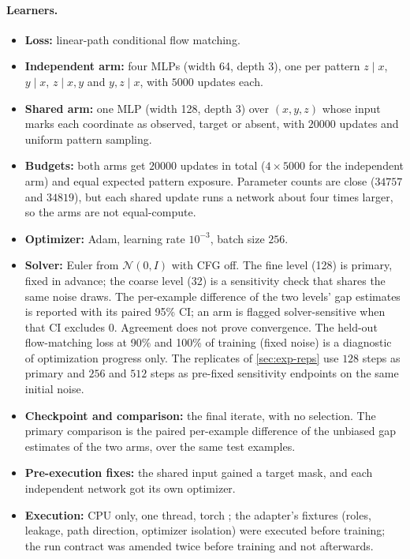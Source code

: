 \documentclass{article}
\theoremstyle{plain}
\theoremstyle{definition}
\theoremstyle{remark}
\begin{document}
\paragraph{Learners.}
\begin{itemize}
\item \textbf{Loss:} linear-path conditional flow matching.
\item \textbf{Independent arm:} four MLPs (width 64, depth 3), one per pattern $z\mid x$, $y\mid x$, $z\mid x,y$ and $y,z\mid x$, with $5000$ updates each.
\item \textbf{Shared arm:} one MLP (width 128, depth 3) over $(x,y,z)$ whose input marks each coordinate as observed, target or absent, with $20000$ updates and uniform pattern sampling.
\item \textbf{Budgets:} both arms get $20000$ updates in total ($4\times5000$ for the independent arm) and equal expected pattern exposure. Parameter counts are close ($34757$ and $34819$), but each shared update runs a network about four times larger, so the arms are not equal-compute.
\item \textbf{Optimizer:} Adam, learning rate $10^{-3}$, batch size $256$.
\item \textbf{Solver:} Euler from $\mathcal N(0,I)$ with CFG off. The fine level (128) is primary, fixed in advance; the coarse level (32) is a sensitivity check that shares the same noise draws. The per-example difference of the two levels' gap estimates is reported with its paired 95\% CI; an arm is flagged solver-sensitive when that CI excludes $0$. Agreement does not prove convergence. The held-out flow-matching loss at 90\% and 100\% of training (fixed noise) is a diagnostic of optimization progress only. The replicates of \cref{sec:exp-reps} use $128$ steps as primary and $256$ and $512$ steps as pre-fixed sensitivity endpoints on the same initial noise.
\item \textbf{Checkpoint and comparison:} the final iterate, with no selection. The primary comparison is the paired per-example difference of the unbiased gap estimates of the two arms, over the same test examples.
\item \textbf{Pre-execution fixes:} the shared input gained a target mask, and each independent network got its own optimizer.
\item \textbf{Execution:} CPU only, one thread, torch \numFmTorch; the adapter's fixtures (roles, leakage, path direction, optimizer isolation) were executed before training; the run contract was amended twice before training and not afterwards.
\end{itemize}
\end{document}
